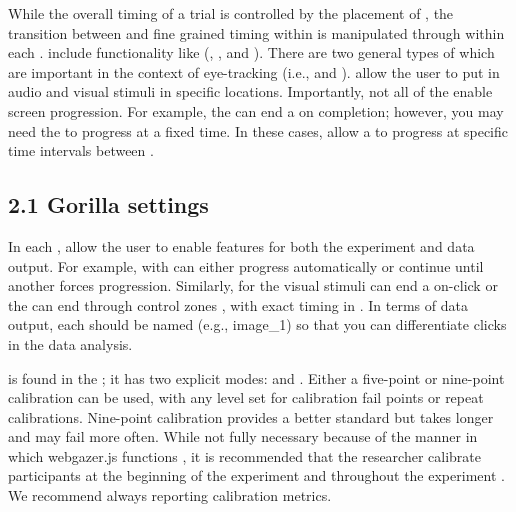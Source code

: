 While the overall timing of a trial is controlled by the placement of , the transition between  and fine grained timing within  is manipulated through  within each .  include functionality like (, , and ). There are two general types of  which are important in the context of eye-tracking (i.e.,  and ).   allow the user to put in audio and visual stimuli in specific locations. Importantly, not all of the   enable screen progression. For example, the   can end a  on completion; however, you may need the  to progress at a fixed time. In these cases,   allow a  to progress at specific time intervals between .  
\newline
\subsection{2.1 Gorilla settings}

In each ,  allow the user to enable features for both the experiment and data output. For example,  with  can either progress automatically or continue until another  forces progression. Similarly,  for the visual stimuli can end a  on-click or the  can end through control zones , with exact timing in . In terms of data output, each  should be named (e.g., image\_1) so that you can differentiate clicks in the data analysis.

 is found in the ; it has two explicit modes:  and . Either a five-point or nine-point calibration can be used, with any level set for calibration fail points or repeat calibrations. Nine-point calibration provides a better standard but takes longer and may fail more often. While not fully necessary because of the manner in which webgazer.js functions \parencite[e.g.,][]{ Chen_et_al_2001}, it is recommended that the researcher calibrate participants at the beginning of the experiment and throughout the experiment \parencite[][]{Prystauka_Altmann_Rothman_2023}. We recommend always reporting calibration metrics.  

